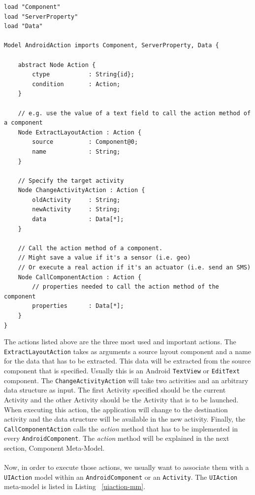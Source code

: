 \begin{lstlisting}[label=androidaction-mm,caption=AndroidAction meta-model, captionpos=t]
load "Component"
load "ServerProperty"
load "Data"

Model AndroidAction imports Component, ServerProperty, Data {
	
	abstract Node Action {
		ctype			: String{id};
		condition 		: Action;
	}

	// e.g. use the value of a text field to call the action method of a component
	Node ExtractLayoutAction : Action {
		source 			: Component@0;
		name 			: String;
	}

	// Specify the target activity
	Node ChangeActivityAction : Action {
		oldActivity 	: String;
		newActivity 	: String;
		data 			: Data[*];
	}

	// Call the action method of a component.
	// Might save a value if it's a sensor (i.e. geo)
	// Or execute a real action if it's an actuator (i.e. send an SMS)
	Node CallComponentAction : Action {
		// properties needed to call the action method of the component
		properties		: Data[*];
	}
}
\end{lstlisting}
The actions listed above are the three most used and important actions. The \texttt{ExtractLayoutAction} takes as arguments a source layout component and a name for the data that has to be extracted. This data will be extracted from the source component that is specified. Usually this is an Android \texttt{TextView} or \texttt{EditText} component. The \texttt{ChangeActivityAction} will take two activities and an arbitrary data structure as input. The first Activity specified should be the current Activity and the other Activity should be the Activity that is to be launched. When executing this action, the application will change to the destination activity and the data structure will be available in the new activity. Finally, the \texttt{CallComponentAction} calls the \textit{action} method that has to be implemented in every \texttt{AndroidComponent}. The \textit{action} method will be explained in the next section, Component Meta-Model. \\ \\
Now, in order to execute those actions, we usually want to associate them with a \texttt{UIAction} model within an \texttt{AndroidComponent} or an \texttt{Activity}. The \texttt{UIAction} meta-model is listed in Listing ~\ref{uiaction-mm}.

